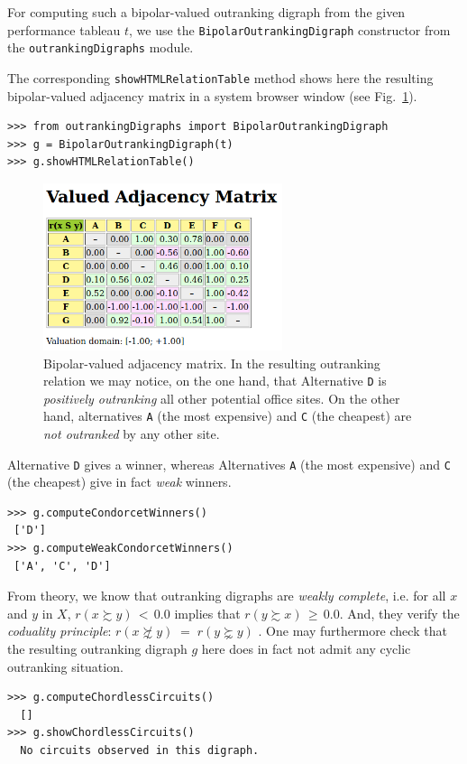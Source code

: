 For computing such a bipolar-valued outranking digraph from the given performance tableau $t$, we use the \texttt{BipolarOutrankingDigraph} constructor from the \texttt{outrankingDigraphs} module.

The corresponding \texttt{showHTMLRelationTable} method shows here the resulting bipolar-valued adjacency matrix in a system browser window (see Fig.~\ref{fig:4.2}).
\begin{lstlisting}
>>> from outrankingDigraphs import BipolarOutrankingDigraph
>>> g = BipolarOutrankingDigraph(t)
>>> g.showHTMLRelationTable()
\end{lstlisting}
\begin{figure}[h]
\sidecaption[t]
\includegraphics[width=7cm]{Figures/officeChoiceOutranking.png}
\caption{Bipolar-valued adjacency matrix. In the resulting outranking relation we may notice, on the one hand, that Alternative \texttt{D} is \emph{positively outranking} all other potential office sites. On the other hand, alternatives \texttt{A} (the most expensive) and \texttt{C} (the cheapest) are \emph{not outranked} by any other site.}
\label{fig:4.2}       %
\end{figure}
Alternative \texttt{D} gives a \Condorcet winner, whereas Alternatives \texttt{A} (the most expensive) and \texttt{C} (the cheapest) give in fact \emph{weak} \Condorcet winners.
\begin{lstlisting}
>>> g.computeCondorcetWinners()
 ['D']
>>> g.computeWeakCondorcetWinners()
 ['A', 'C', 'D']
\end{lstlisting}

From theory, we know that outranking digraphs are \emph{weakly complete}, i.e. for all $x$ and $y$ in $X$, $r(x \succsim y)\, <\, 0.0$ implies that $r(y \succsim x)\, \geq\, 0.0$. And, they verify the \emph{coduality principle}:  $r(x \not\succsim y) \;=\; r(y \succnsim y)$ \citep{BIS-2013}. One may furthermore check that the resulting outranking digraph $g$ here does in fact not admit any cyclic outranking situation.
\begin{lstlisting}
>>> g.computeChordlessCircuits()
  []
>>> g.showChordlessCircuits()
  No circuits observed in this digraph.
\end{lstlisting}

